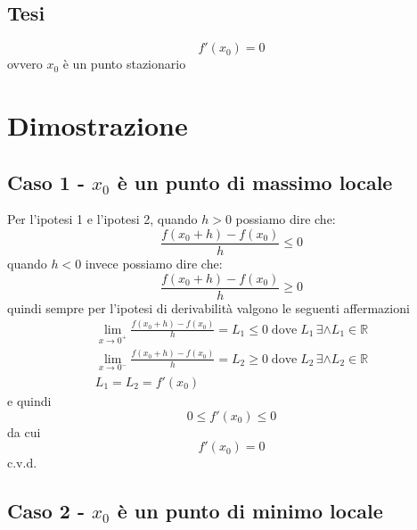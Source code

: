 \documentclass[../../analisi1]{subfiles}
\begin{document}
            \subsection*{Tesi}

                \[f'(x_0) = 0\] ovvero \(x_0\) è un punto stazionario

        \section*{Dimostrazione}

            \medskip

            \subsection*{Caso 1 - \(x_0\) è un punto di massimo locale}

                \smallskip

                Per l'ipotesi 1 e l'ipotesi 2, quando \(h>0\) possiamo dire che:
                \[\frac{f(x_0 + h) - f(x_0)}{h}  \leqslant 0\]
                quando \(h<0\) invece possiamo dire che:
                \[\frac{f(x_0 + h) - f(x_0)}{h}  \geqslant 0\]
                quindi sempre per l'ipotesi di derivabilità valgono le seguenti affermazioni
                \begin{gather*}
                    \lim_{x\to 0^+} \frac{f(x_0 + h) - f(x_0)}{h} = L_1 \leqslant 0 \; \text{dove} \; L_1 \, \exists \land L_1 \in \mathbb{R}\\
                    \lim_{x\to 0^-} \frac{f(x_0 + h) - f(x_0)}{h} = L_2  \geqslant 0 \; \text{dove} \; L_2 \, \exists \land L_2 \in \mathbb{R}\\
                    L_1 = L_2 = f'(x_0)
                \end{gather*}
                e quindi
                \[0 \leqslant f'(x_0) \leqslant 0\]
                da cui
                \[f'(x_0)=0\]
                c.v.d.

            \subsection*{Caso 2 - \(x_0\) è un punto di minimo locale}

                \smallskip
\end{document}
